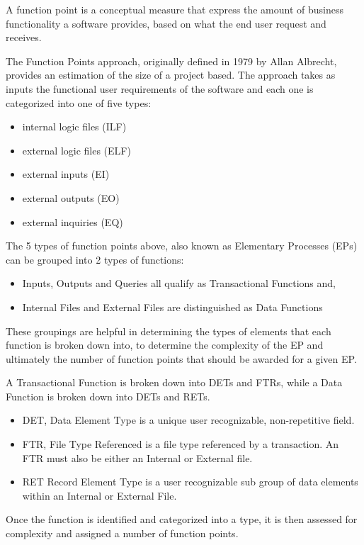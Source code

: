 A function point is a conceptual measure that express the amount of business functionality a software provides, based on what the end user request and receives.

The Function Points approach, originally defined in 1979 by Allan Albrecht, provides an estimation of the size of a project based.  The approach takes as inputs the functional user requirements of the software and each one is categorized into one of five types:
\begin{itemize}
	\item internal logic files (ILF) 
	\item external logic files (ELF)
	\item external inputs (EI)
	\item external outputs (EO)
	\item external inquiries (EQ)
\end{itemize} 

The 5 types of function points above, also known as Elementary Processes (EPs) can be grouped into 2 types of functions:

\begin{itemize}
	\item Inputs, Outputs and Queries all qualify as Transactional Functions and,
	\item Internal Files and External Files are distinguished as Data Functions
\end{itemize}

These groupings are helpful in determining the types of elements that each function is broken down into, to determine the complexity of the EP and ultimately the number of function points that should be awarded for a given EP.

A Transactional Function is broken down into DETs and FTRs, while a Data Function is broken down into DETs and RETs.

\begin{itemize}
	\item DET, Data Element Type is a unique user recognizable, non-repetitive field.
	\item FTR, File Type Referenced is a file type referenced by a transaction. An FTR must also be either an Internal or External file.
	\item RET Record Element Type is a user recognizable sub group of data elements within an Internal or External File.
\end{itemize}
   
Once the function is identified and categorized into a type, it is then assessed for complexity and assigned a number of function points.


